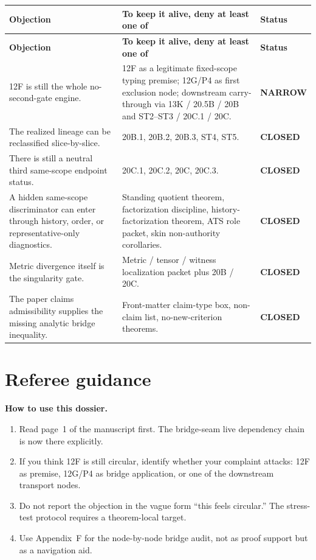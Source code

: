 \documentclass[11pt,letterpaper]{article}
\newcommand{\closed}{\textcolor{Good}{\textbf{CLOSED}}}
\newcommand{\narrow}{\textcolor{Warn}{\textbf{NARROW}}}
\begin{document}
\begin{longtable}{L{2.15in}L{2.35in}L{1.5in}}
\toprule
\textbf{Objection} & \textbf{To keep it alive, deny at least one of} & \textbf{Status}\\
\midrule
\endfirsthead
\toprule
\textbf{Objection} & \textbf{To keep it alive, deny at least one of} & \textbf{Status}\\
\midrule
\endhead
12F is still the whole no-second-gate engine. & 12F as a legitimate fixed-scope typing premise; 12G/P4 as first exclusion node; downstream carry-through via 13K / 20.5B / 20B and ST2--ST3 / 20C.1 / 20C. & \narrow\\
The realized lineage can be reclassified slice-by-slice. & 20B.1, 20B.2, 20B.3, ST4, ST5. & \closed\\
There is still a neutral third same-scope endpoint status. & 20C.1, 20C.2, 20C, 20C.3. & \closed\\
A hidden same-scope discriminator can enter through history, order, or representative-only diagnostics. & Standing quotient theorem, factorization discipline, history-factorization theorem, ATS role packet, skin non-authority corollaries. & \closed\\
Metric divergence itself is the singularity gate. & Metric / tensor / witness localization packet plus 20B / 20C. & \closed\\
The paper claims admissibility supplies the missing analytic bridge inequality. & Front-matter claim-type box, non-claim list, no-new-criterion theorems. & \closed\\
\bottomrule
\end{longtable}

\section{Referee guidance}

\begin{freezebox}
\textbf{How to use this dossier.}
\begin{enumerate}[label=(\arabic*),leftmargin=2.2em]
\item Read page~1 of the manuscript first. The bridge-seam live dependency chain is now there explicitly.
\item If you think 12F is still circular, identify whether your complaint attacks: 12F as premise, 12G/P4 as bridge application, or one of the downstream transport nodes.
\item Do not report the objection in the vague form ``this feels circular.'' The stress-test protocol requires a theorem-local target.
\item Use Appendix~F for the node-by-node bridge audit, not as proof support but as a navigation aid.
\end{enumerate}
\end{freezebox}
\end{document}
